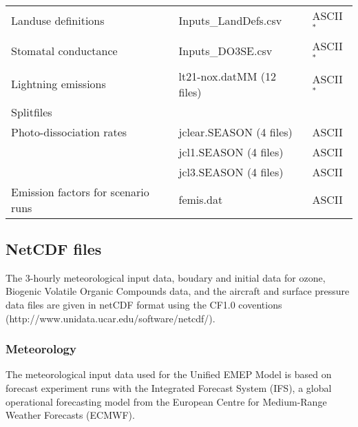 \begin{table}
\begin{center}
\begin{small}
\begin{tabular}{lll}
Landuse definitions & Inputs\_LandDefs.csv & ASCII$^*$\\
Stomatal conductance & Inputs\_DO3SE.csv & ASCII$^*$\\
Lightning emissions & lt21-nox.datMM  \quad (12 files) & ASCII$^*$\\
Splitfiles & &\\
Photo-dissociation rates & jclear.SEASON \quad (4 files) & ASCII\\
 & jcl1.SEASON \quad (4 files) & ASCII\\
 & jcl3.SEASON \quad (4 files) & ASCII\\
Emission factors for scenario runs & femis.dat & ASCII\\
\hline
\end{tabular}
\end{small}
\end{center}

\end{table}

\newpage
\subsection{NetCDF files}


The 3-hourly meteorological input data, boudary and initial data for ozone, 
Biogenic Volatile Organic Compounds data, and the aircraft and surface pressure 
data files are given in netCDF format using the CF1.0 coventions 
(http://www.unidata.ucar.edu/software/netcdf/).



\subsubsection{Meteorology}

The meteorological input data used for the Unified EMEP Model is based on
forecast experiment runs with the Integrated Forecast System (IFS), a global
operational forecasting model from the European Centre for Medium-Range
Weather Forecasts (ECMWF).

